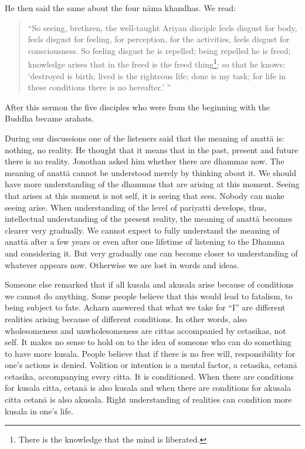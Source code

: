 He then said the same about the four nāma khandhas. We read:
\begin{quote}

``So seeing, brethren, the well-taught Ariyan disciple feels disgust for
body, feels disgust for feeling, for perception, for the activities,
feels disgust for consciousness. So feeling disgust he is repelled;
being repelled he is freed; knowledge arises that in the freed is the
freed thing\footnote{There is the knowledge
that the mind is liberated.}; so that he
knows: `destroyed is birth; lived is the righteous life; done is my
task; for life in these conditions there is no hereafter.' ''
\end{quote}

After this sermon the five disciples who were from the beginning with
the Buddha became arahats.

During our discussions one of the listeners said that the meaning of
anattā is: nothing, no reality. He thought that it means that in the
past, present and future there is no reality. Jonothan asked him whether
there are dhammas now. The meaning of anattā cannot be understood merely
by thinking about it. We should have more understanding of the dhammas
that are arising at this moment. Seeing that arises at this moment is
not self, it is seeing that sees. Nobody can make seeing arise. When
understanding of the level of pariyatti develops, thus, intellectual
understanding of the present reality, the meaning of anattā becomes
clearer very gradually. We cannot expect to fully understand the meaning
of anattā after a few years or even after one lifetime of listening to
the Dhamma and considering it. But very gradually one can become closer
to understanding of whatever appears now. Otherwise we are lost in words
and ideas.

Someone else remarked that if all kusala and akusala arise because of
conditions we cannot do anything. Some people believe that this would
lead to fatalism, to being subject to fate. Acharn answered that what we
take for ``I'' are different realities arising because of different
conditions. In other words, also wholesomeness and unwholesomeness are
cittas accompanied by cetasikas, not self. It makes no sense to hold on
to the idea of someone who can do something to have more kusala. People
believe that if there is no free will, responsibility for one's actions
is denied. Volition or intention is a mental factor, a cetasika, cetanā
cetasika, accompanying every citta. It is conditioned. When there are
conditions for kusala citta, cetanā is also kusala and when there are
conditions for akusala citta cetanā is also akusala. Right understanding
of realities can condition more kusala in one's life.

